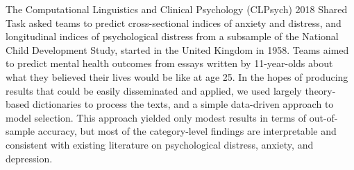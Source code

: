 The Computational Linguistics and Clinical Psychology (CLPsych) 2018 Shared Task asked teams to predict cross-sectional indices of anxiety and distress, and longitudinal indices of psychological distress from a subsample of the National Child Development Study, started in the United Kingdom in 1958. Teams aimed to predict mental health outcomes from essays written by 11-year-olds about what they believed their lives would be like at age 25. In the hopes of producing results that could be easily disseminated and applied, we used largely theory-based dictionaries to process the texts, and a simple data-driven approach to model selection. This approach yielded only modest results in terms of out-of-sample accuracy, but most of the category-level findings are interpretable and consistent with existing literature on psychological distress, anxiety, and depression.
